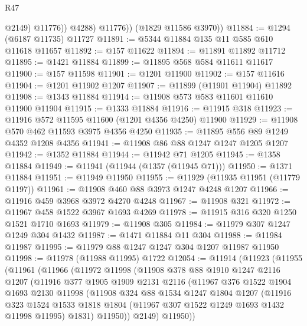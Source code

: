 \begin{lexlean}{R47}
\begin{coremodule}
                  @2149)
                @11776))
            @4288)
          @11776))
      (@1829 @11586 @3970))
@11884 := @1294 (@6187 @11735) @11727
@11891 := @5344 @11884 @135 @11 @585 @610 @11618 @11657
@11892 := @157 @11622
@11894 := @11891 @11892 @11712
@11895 := @1421 @11884
@11899 := @11895 @568 @584 @11611 @11617
@11900 := @157 @11598
@11901 := @1201 @11900
@11902 := @157 @11616
@11904 := @1201 @11902 @1207
@11907 := @11899 (@11901 @11904) @11892
@11908 := @1343 @11884
@11914 := @11908 @573 @583 @11601 @11610 @11900 @11904
@11915 := @1333 @11884
@11916 := @11915 @318
@11923 := @11916 @572 @11595 @11600 (@1201 @4356 @4250) @11900
@11929 := @11908 @570 @462 @11593 @3975 @4356 @4250
@11935 := @11895 @556 @89 @1249 @4352 @1208 @4356
@11941 := @11908 @86 @88 @1247 @1247 @1205 @1207
@11942 := @1352 @11884
@11944 := @11942 @71 @1205
@11945 := @1358 @11884
@11949 := @11941 (@11944 (@1357 (@11945 @71)))
@11950 := @1371 @11884
@11951 := @11949 @11950
@11955 := @11929 (@11935 @11951 (@11779 @1197))
@11961 := @11908 @460 @88 @3973 @1247 @4248 @1207
@11966 := @11916 @459 @3968 @3972 @4270 @4248
@11967 := @11908 @321
@11972 := @11967 @458 @1522 @3967 @1693 @4269
@11978 := @11915 @316 @320 @1250 @1521 @1710 @1693
@11979 := @11908 @305
@11984 := @11979 @307 @1247 @1249 @304 @1432
@11987 := @1471 @11884 @11 @304
@11988 := @11984 @11987
@11995 := @11979 @88 @1247 @1247 @304 @1207 @11987 @11950
@11998 := @11978 (@11988 @11995) @1722
@12054 := @11914
    (@11923
      (@11955
        (@11961
          (@11966
            (@11972
              @11998
              (@11908
                @378
                @88
                @1910
                @1247
                @2116
                @1207
                (@11916
                  @377
                  @1905
                  @1909
                  @2131
                  @2116
                  (@11967
                    @376
                    @1522
                    @1904
                    @1693
                    @2130
                    @11998
                    (@11908
                      @324
                      @88
                      @1534
                      @1247
                      @1804
                      @1207
                      (@11916
                        @323
                        @1524
                        @1533
                        @1818
                        @1804
                        (@11967 @307 @1522 @1249 @1693 @1432 @11998 @11995)
                        @1831)
                      @11950))
                  @2149)
                @11950))

\end{coremodule}
\end{lexlean}
